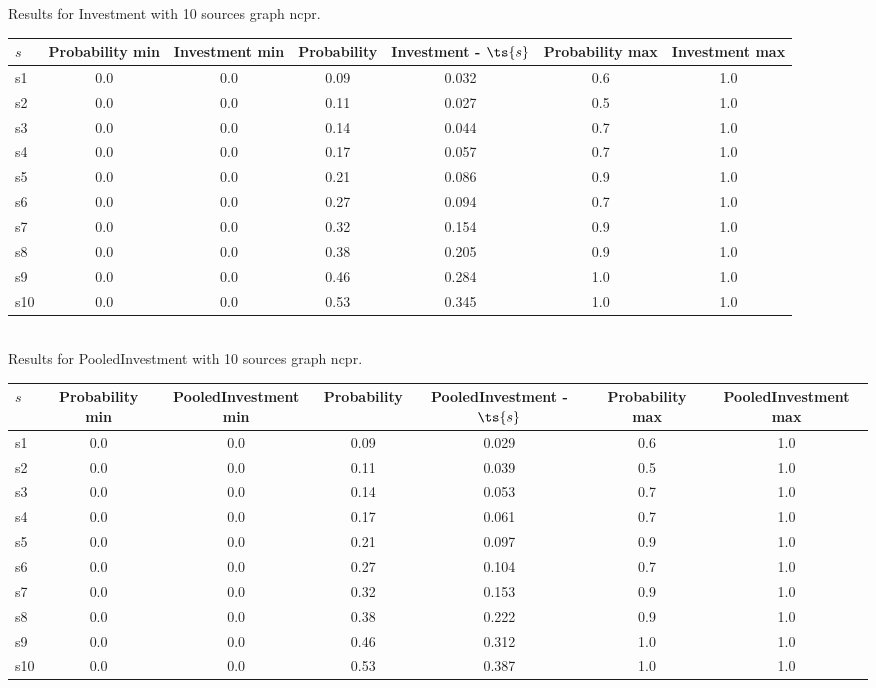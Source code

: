 \documentclass{article}
\begin{document}
\noindent Results for Investment with 10 sources graph ncpr.

\noindent\begin{tabular}{|l|c|c|c|c|c|c|}
\hline
$s$& Probability min & Investment min & Probability & Investment - $\ts{s}$ & Probability max & Investment max\\
\hline
s1 &0.0 & 0.0 & 0.09 & 0.032 & 0.6 & 1.0\\
\hline
s2 &0.0 & 0.0 & 0.11 & 0.027 & 0.5 & 1.0\\
\hline
s3 &0.0 & 0.0 & 0.14 & 0.044 & 0.7 & 1.0\\
\hline
s4 &0.0 & 0.0 & 0.17 & 0.057 & 0.7 & 1.0\\
\hline
s5 &0.0 & 0.0 & 0.21 & 0.086 & 0.9 & 1.0\\
\hline
s6 &0.0 & 0.0 & 0.27 & 0.094 & 0.7 & 1.0\\
\hline
s7 &0.0 & 0.0 & 0.32 & 0.154 & 0.9 & 1.0\\
\hline
s8 &0.0 & 0.0 & 0.38 & 0.205 & 0.9 & 1.0\\
\hline
s9 &0.0 & 0.0 & 0.46 & 0.284 & 1.0 & 1.0\\
\hline
s10 &0.0 & 0.0 & 0.53 & 0.345 & 1.0 & 1.0\\
\hline
\end{tabular}\\

\noindent Results for PooledInvestment with 10 sources graph ncpr.

\noindent\begin{tabular}{|l|c|c|c|c|c|c|}
\hline
$s$& Probability min & PooledInvestment min & Probability & PooledInvestment - $\ts{s}$ & Probability max & PooledInvestment max\\
\hline
s1 &0.0 & 0.0 & 0.09 & 0.029 & 0.6 & 1.0\\
\hline
s2 &0.0 & 0.0 & 0.11 & 0.039 & 0.5 & 1.0\\
\hline
s3 &0.0 & 0.0 & 0.14 & 0.053 & 0.7 & 1.0\\
\hline
s4 &0.0 & 0.0 & 0.17 & 0.061 & 0.7 & 1.0\\
\hline
s5 &0.0 & 0.0 & 0.21 & 0.097 & 0.9 & 1.0\\
\hline
s6 &0.0 & 0.0 & 0.27 & 0.104 & 0.7 & 1.0\\
\hline
s7 &0.0 & 0.0 & 0.32 & 0.153 & 0.9 & 1.0\\
\hline
s8 &0.0 & 0.0 & 0.38 & 0.222 & 0.9 & 1.0\\
\hline
s9 &0.0 & 0.0 & 0.46 & 0.312 & 1.0 & 1.0\\
\hline
s10 &0.0 & 0.0 & 0.53 & 0.387 & 1.0 & 1.0\\
\hline
\end{tabular}\\
\end{document}
